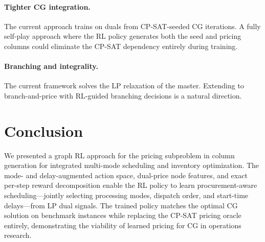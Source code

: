 \documentclass[11pt]{article}
\begin{document}
\paragraph{Tighter CG integration.}
The current approach trains on duals from CP-SAT-seeded CG iterations.
A fully self-play approach where the RL policy generates both the seed and pricing columns could eliminate the CP-SAT dependency entirely during training.

\paragraph{Branching and integrality.}
The current framework solves the LP relaxation of the master.
Extending to branch-and-price with RL-guided branching decisions is a natural direction.

\section{Conclusion}\label{sec:conclusion}

We presented a graph RL approach for the pricing subproblem in column generation for integrated multi-mode scheduling and inventory optimization.
The mode- and delay-augmented action space, dual-price node features, and exact per-step reward decomposition enable the RL policy to learn procurement-aware scheduling---jointly selecting processing modes, dispatch order, and start-time delays---from LP dual signals.
The trained policy matches the optimal CG solution on benchmark instances while replacing the CP-SAT pricing oracle entirely, demonstrating the viability of learned pricing for CG in operations research.




\end{document}
